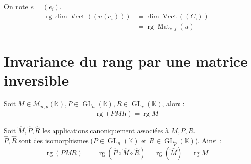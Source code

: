 \documentclass[../main.tex]{subfiles}
\begin{document}
On note $e = (e_i)$. 
\begin{align*}
    \operatorname{rg} \dim \operatorname{Vect}((u(e_i)))
    &= \dim \operatorname{Vect} ((C_i)) \\
    &= \operatorname{rg} \operatorname{Mat}_{e,f}(u)
\end{align*}

\section{Invariance du rang par une matrice inversible}
\begin{tcolorbox}[title=Propostion 28.35, title filled=false, colframe=lightblue, colback=lightblue!10!white]
    Soit $M\in \mathcal{M}_{n,p}(\mathbb{K}), P\in \operatorname{GL}_n(\mathbb{K}), R\in \operatorname{GL}_p(\mathbb{K})$, alors : 
    \begin{align*}
        \operatorname{rg}(PMR) = \operatorname{rg} M
    \end{align*}
\end{tcolorbox}

\noindent Soit $\hat M, \hat P, \hat R$ les applications canoniquement associées à $M, P, R$. \\
$\hat P, \hat R$ sont des isomorphismes ($P\in \operatorname{GL}_n(\mathbb{K})$ et $R\in \operatorname{GL}_p(\mathbb{K})$). Ainsi :
\begin{align*}
    \operatorname{rg} (PMR) &= \operatorname{rg} (\hat P\circ \hat M\circ \hat R) = \operatorname{rg} (\hat M) = \operatorname{rg} M
\end{align*}
\end{document}
